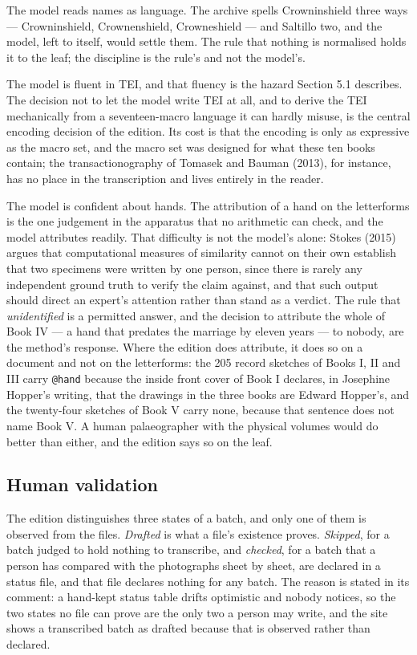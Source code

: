 \documentclass[11pt]{article}
\begin{document}
The model reads names as language. The archive spells Crowninshield three ways — Crowninshield, Crownenshield, Crowneshield — and Saltillo two, and the model, left to itself, would settle them. The rule that nothing is normalised holds it to the leaf; the discipline is the rule's and not the model's.

The model is fluent in TEI, and that fluency is the hazard Section 5.1 describes. The decision not to let the model write TEI at all, and to derive the TEI mechanically from a seventeen-macro language it can hardly misuse, is the central encoding decision of the edition. Its cost is that the encoding is only as expressive as the macro set, and the macro set was designed for what these ten books contain; the transactionography of Tomasek and Bauman (2013), for instance, has no place in the transcription and lives entirely in the reader.

The model is confident about hands. The attribution of a hand on the letterforms is the one judgement in the apparatus that no arithmetic can check, and the model attributes readily. That difficulty is not the model's alone: Stokes (2015) argues that computational measures of similarity cannot on their own establish that two specimens were written by one person, since there is rarely any independent ground truth to verify the claim against, and that such output should direct an expert's attention rather than stand as a verdict. The rule that \emph{unidentified} is a permitted answer, and the decision to attribute the whole of Book IV --- a hand that predates the marriage by eleven years --- to nobody, are the method's response. Where the edition does attribute, it does so on a document and not on the letterforms: the 205 record sketches of Books I, II and III carry \texttt{@hand} because the inside front cover of Book I declares, in Josephine Hopper's writing, that the drawings in the three books are Edward Hopper's, and the twenty-four sketches of Book V carry none, because that sentence does not name Book V. A human palaeographer with the physical volumes would do better than either, and the edition says so on the leaf.

\subsection{Human validation}

The edition distinguishes three states of a batch, and only one of them is observed from the files. \emph{Drafted} is what a file's existence proves. \emph{Skipped}, for a batch judged to hold nothing to transcribe, and \emph{checked}, for a batch that a person has compared with the photographs sheet by sheet, are declared in a status file, and that file declares nothing for any batch. The reason is stated in its comment: a hand-kept status table drifts optimistic and nobody notices, so the two states no file can prove are the only two a person may write, and the site shows a transcribed batch as drafted because that is observed rather than declared.
\end{document}
